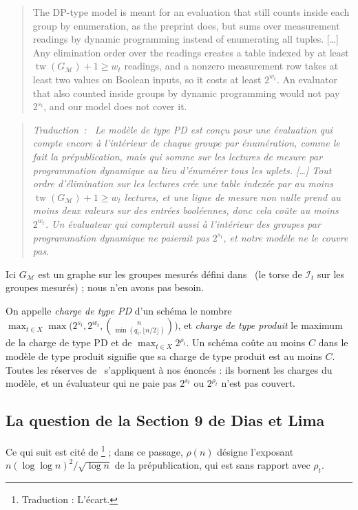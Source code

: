\documentclass[11pt,a4paper]{article}
\makeatletter
\theoremstyle{definition}
\theoremstyle{remark}
\newcommand{\cI}{\mathcal{I}}
\newcommand{\tw}{\operatorname{tw}}
\newcommand{\englishhyph}{\@ifundefined{l@english}{}{\language\l@english}}
\newcommand{\eng}[1]{{\englishhyph #1}}
\newenvironment{dlquote}{\begin{quote}\englishhyph}{\end{quote}}
\newenvironment{dltrad}{\begin{quote}\itshape\textup{Traduction~:}\ \ignorespaces}{\end{quote}}
\makeatother
\begin{document}
\begin{dlquote}
The DP-type model is meant for an evaluation that still counts inside each group by
enumeration, as the preprint does, but sums over measurement readings by dynamic programming
instead of enumerating all tuples. [\dots] Any elimination order over the readings creates a
table indexed by at least $\tw(G_{\mathcal M})+1\ge w_t$ readings, and a nonzero measurement
row takes at least two values on Boolean inputs, so it costs at least $2^{w_t}$. An evaluator
that also counted inside groups by dynamic programming would not pay $2^{s_t}$, and our model
does not cover it.
\end{dlquote}

\begin{dltrad}
Le modèle de type PD est conçu pour une évaluation qui compte encore à l'intérieur de chaque
groupe par énumération, comme le fait la prépublication, mais qui somme sur les lectures de
mesure par programmation dynamique au lieu d'énumérer tous les uplets. [\dots] Tout ordre
d'élimination sur les lectures crée une table indexée par au moins
$\tw(G_{\mathcal M})+1\ge w_t$ lectures, et une ligne de mesure non nulle prend au moins deux
valeurs sur des entrées booléennes, donc cela coûte au moins $2^{w_t}$. Un évaluateur qui
compterait aussi à l'intérieur des groupes par programmation dynamique ne paierait pas
$2^{s_t}$, et notre modèle ne le couvre pas.
\end{dltrad}

Ici $G_{\mathcal M}$ est un graphe sur les groupes mesurés défini dans~\cite{DL} (le torse
de $\cI_t$ sur les groupes mesurés) ; nous n'en avons pas besoin.

On appelle \emph{charge de type PD} d'un schéma le nombre
$\max_{t\in X}\max\bigl(2^{s_t},2^{w_t},\binom{n}{\min(q_t,\lfloor n/2\rfloor)}\bigr)$, et
\emph{charge de type produit} le maximum de la charge de type PD et de
$\max_{t\in X}2^{\rho_t}$. \og Un schéma coûte au moins $C$ dans le modèle de type
produit\fg{} signifie que sa charge de type produit est au moins $C$. Toutes les réserves
de~\cite{DL} s'appliquent à nos énoncés : ils bornent les charges du modèle, et un
évaluateur qui ne paie pas $2^{s_t}$ ou $2^{\rho_t}$ n'est pas couvert.

\subsection{La question de la Section 9 de Dias et Lima}\label{sec:question}

Ce qui suit est cité de \cite[Section~9, \eng{``The gap''}]{DL}\footnote{Traduction :
\og L'écart\fg{}.} ; dans ce passage, $\rho(n)$ désigne l'exposant
$n(\log\log n)^2/\sqrt{\log n}$ de la prépublication, qui est sans rapport avec $\rho_t$.
\end{document}
